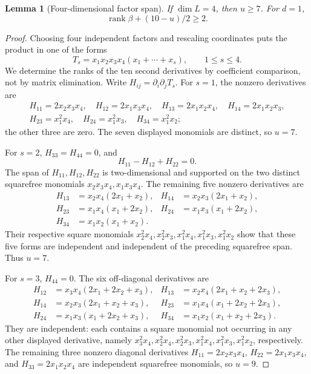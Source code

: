 \documentclass[11pt]{amsart}
\newtheorem{lemma}[theorem]{Lemma}
\theoremstyle{definition}
\numberwithin{equation}{section}
\newcommand{\rank}{\operatorname{rank}}
\begin{document}
\begin{lemma}[Four-dimensional factor span]\label{lem:four}
If \(\dim L=4\), then \(u\ge7\). For \(d=1\),
\[
 \rank\beta+(10-u)/2\ge2.
\]
\end{lemma}
\begin{proof}
Choosing four independent factors and rescaling coordinates puts the product
in one of the forms
\[
 T_s=x_1x_2x_3x_4(x_1+\cdots+x_s),\qquad 1\le s\le4.
\]
We determine the ranks of the ten second derivatives by coefficient
comparison, not by matrix elimination. Write \(H_{ij}=\partial_i\partial_jT_s\).
For \(s=1\), the nonzero derivatives are
\[
\begin{gathered}
H_{11}=2x_2x_3x_4,\quad H_{12}=2x_1x_3x_4,\quad
H_{13}=2x_1x_2x_4,\quad H_{14}=2x_1x_2x_3,\\
H_{23}=x_1^2x_4,\quad H_{24}=x_1^2x_3,\quad
H_{34}=x_1^2x_2;
\end{gathered}
\]
the other three are zero. The seven displayed monomials are distinct, so
\(u=7\).

For \(s=2\), \(H_{33}=H_{44}=0\), and
\[
H_{11}-H_{12}+H_{22}=0.
\]
The span of \(H_{11},H_{12},H_{22}\) is two-dimensional and supported on
the two distinct squarefree monomials \(x_2x_3x_4,x_1x_3x_4\).
The remaining five nonzero derivatives are
\[
\begin{aligned}
H_{13}&=x_2x_4(2x_1+x_2),&
H_{14}&=x_2x_3(2x_1+x_2),\\
H_{23}&=x_1x_4(x_1+2x_2),&
H_{24}&=x_1x_3(x_1+2x_2),\\
H_{34}&=x_1x_2(x_1+x_2).
\end{aligned}
\]
Their respective square monomials \(x_2^2x_4,x_2^2x_3,
x_1^2x_4,x_1^2x_3,x_1^2x_2\) show that these five forms
are independent and independent of the preceding squarefree span.
Thus \(u=7\).

For \(s=3\), \(H_{44}=0\). The six off-diagonal derivatives are
\[
\begin{aligned}
H_{12}&=x_3x_4(2x_1+2x_2+x_3),&
H_{13}&=x_2x_4(2x_1+x_2+2x_3),\\
H_{14}&=x_2x_3(2x_1+x_2+x_3),&
H_{23}&=x_1x_4(x_1+2x_2+2x_3),\\
H_{24}&=x_1x_3(x_1+2x_2+x_3),&
H_{34}&=x_1x_2(x_1+x_2+2x_3).
\end{aligned}
\]
They are independent: each contains a square monomial not occurring in
any other displayed derivative, namely
\(x_3^2x_4,x_2^2x_4,x_2^2x_3,x_1^2x_4,x_1^2x_3,x_1^2x_2\),
respectively. The remaining three nonzero diagonal derivatives
\(H_{11}=2x_2x_3x_4\), \(H_{22}=2x_1x_3x_4\), and
\(H_{33}=2x_1x_2x_4\) are independent squarefree monomials, so \(u=9\).


\end{proof}
\end{document}
